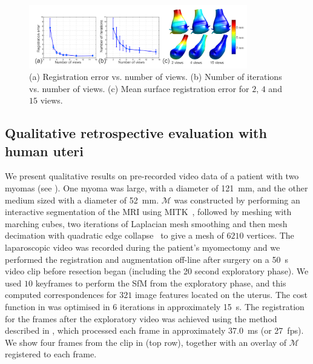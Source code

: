 \begin{figure}[htbp]
  \centering
  \includegraphics[width=0.85\textwidth]{./figs/errors.pdf}
\caption{(a) Registration error vs. number of views. (b) Number of iterations vs. number of views. (c) Mean surface registration error for $2$, $4$ and $15$ views.}
\label{fig:results}
\end{figure}

\subsection{Qualitative retrospective evaluation with human uteri}
We present qualitative results on pre-recorded video data of a patient with two myomas (see ). 
One myoma was large, with a diameter of \SI{121}{\milli\metre}, and the other medium sized with a diameter of \SI{52}{\milli\metre}.
$\mathcal{M}$ was constructed by performing an interactive segmentation of the MRI using MITK~\cite{Wolf_themedical}, followed by meshing with marching cubes, two iterations of Laplacian mesh smoothing and then mesh decimation with quadratic edge collapse~\cite{conf/siggraph/GarlandH97} to give a mesh of $6210$ vertices. The laparoscopic video was recorded during the patient's myomectomy and we performed the registration and augmentation off-line after surgery on a \SI{50}{\second} video clip before resection began (including the 20 second exploratory phase). We used $10$ keyframes to perform the SfM from the exploratory phase, and this computed correspondences for $321$ image features located on the uterus. The cost function in  was optimised in $6$ iterations in approximately \SI{15}{\second}.%
The registration for the frames after the exploratory video was achieved using the method described in , which processed each frame in approximately \SI{37.0}{\milli\second} (or \SI{27}{fps}). We show four frames from the clip in  (top row), together with an overlay of $\mathcal{M}$ registered to each frame.
